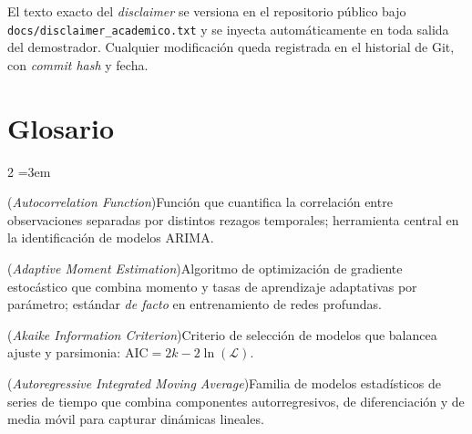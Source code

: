 \documentclass[12pt,letterpaper]{report}
\begin{document}
El texto exacto del \textit{disclaimer} se versiona en el repositorio público bajo \texttt{docs/disclaimer\_academico.txt} y se inyecta automáticamente en toda salida del demostrador. Cualquier modificación queda registrada en el historial de Git, con \textit{commit hash} y fecha.

\clearpage

\chapter*{Glosario}

\begin{multicols}{2}
\setlength{\columnsep}{14pt}
\scriptsize
\sloppy   %
\emergencystretch=3em  %
\begin{description}[leftmargin=0pt, labelindent=0pt, itemindent=0pt,
                    labelsep=0.4em, font=\bfseries\scriptsize,
                    itemsep=2pt, parsep=0pt, topsep=0pt]
    \item[ACF] (\textit{Autocorrelation Function})\hspace{0.3em}Función que cuantifica la correlación entre observaciones separadas por distintos rezagos temporales; herramienta central en la identificación de modelos ARIMA.

    \item[Adam] (\textit{Adaptive Moment Estimation})\hspace{0.3em}Algoritmo de optimización de gradiente estocástico que combina momento y tasas de aprendizaje adaptativas por parámetro; estándar \textit{de facto} en entrenamiento de redes profundas.

    \item[AIC] (\textit{Akaike Information Criterion})\hspace{0.3em}Criterio de selección de modelos que balancea ajuste y parsimonia: $\text{AIC} = 2k - 2\ln(\mathcal{L})$.

    \item[ARIMA] (\textit{Autoregressive Integrated Moving Average})\hspace{0.3em}Familia de modelos estadísticos de series de tiempo que combina componentes autorregresivos, de diferenciación y de media móvil para capturar dinámicas lineales.


\end{description}
\end{multicols}
\end{document}

